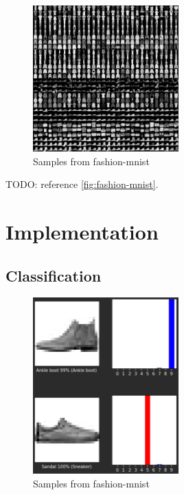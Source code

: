 \documentclass[conference]{IEEEtran}
\begin{document}
    \begin{figure}
        \caption{Samples from fashion-mnist}
        \label{fig:fashion-mnist}
        \begin{center}
            \includegraphics[width=0.5\textwidth]{data.png}
        \end{center}
    \end{figure}

    TODO: reference \autoref{fig:fashion-mnist}.

    \section{Implementation}\label{sec:implementation}

    \subsection{Classification}\label{subsec:implementation-classification}

    \begin{figure}
        \caption{Samples from fashion-mnist}
        \label{fig:classification}
        \begin{center}
            \includegraphics[width=0.5\textwidth]{classification.png}
        \end{center}
    \end{figure}
\end{document}
